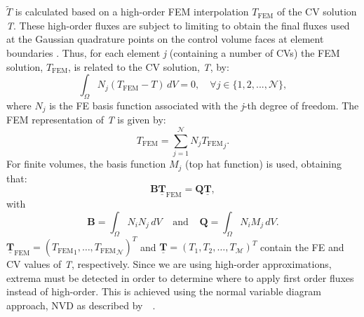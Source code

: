 \documentclass[preprint,authoryear,12pt]{elsarticle}
\begin{document}
$\widetilde{T}$ is calculated based on a high-order FEM interpolation $T_{\text{FEM}}$ of the CV solution {\it T}. These high-order fluxes are subject to limiting to obtain the final fluxes used at the Gaussian quadrature points on the control volume faces at element boundaries \citep{voller_2009,gomes_book_2012}.  Thus, for each element {\it j} (containing a number of CVs) the FEM solution, $T_{\text{FEM}}$, is related to the CV solution, {\it T}, by: 
\begin{equation}
  \int_{\Omega} N_{j} \left({T_{\text{FEM}}} - T\right) \,d V = 0, \quad \forall j\in \{1,2,...,{\mathcal N}\},
\end{equation}
where $N_{j}$ is the FE basis function associated with the {\it j}-th degree of freedom. The FEM representation of {\it T} is given by:
\begin{equation}
  T_{\text{FEM}} = \sum\limits_{j=1}^{\mathcal{N}} N_{j} {T_{\text{FEM}}}_{j}.
\end{equation}
For finite volumes, the basis function $M_{j}$ (top hat function) is used, obtaining that:
\begin{equation}
  \mathbf{B} \underline{\mathbf{T}}_{\text{FEM}} = \mathbf{Q} \underline{\mathbf{T}},
\end{equation} 
with
\begin{displaymath}
  \mathbf{B} = \int_{\Omega} N_{i}N_{j} \,dV \;\;\;\;\text{and}\;\;\;\; \mathbf{Q} = \int_{\Omega} N_{i} M_{j} \,  dV.
\end{displaymath} 
$\underline{\mathbf{T}}_{\text{FEM}} = \left({T_{\text{FEM}}}_{1}, \ldots, {T_{\text{FEM}}}_{\mathcal{N}} \right)^{T}$ and $ \underline{\mathbf{T}} =\left(T_{1}, T_{2}, \ldots, T_\mathcal{M} \right)^{T}$ contain the FE and CV values of {\it T}, respectively. Since we are using high-order approximations, extrema must be detected in order to determine where to apply first order fluxes instead of high-order. This is achieved using the normal variable diagram approach, NVD as described by~\citet{darwish_1993}~\citep[see also][]{jasak_1999,darwish_2003}.


\end{document}
